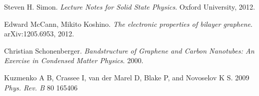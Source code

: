 \documentclass{article}
\begin{document}
\begin{thebibliography}{9}
Steven H. Simon.
\textit{Lecture Notes for Solid State Physics}.
Oxford University, 2012.

Edward McCann, Mikito Koshino.
\textit{The electronic properties of bilayer graphene}.
arXiv:1205.6953, 2012.

Christian Schonenberger.
\textit{Bandstructure of Graphene and Carbon Nanotubes: An Exercise in Condensed Matter Physics}.
2000.

Kuzmenko A B, Crassee I, van der Marel D, Blake P, and Novoselov K S. 2009
\textit{Phys. Rev. B} 80 165406

\end{thebibliography}
\end{document}
